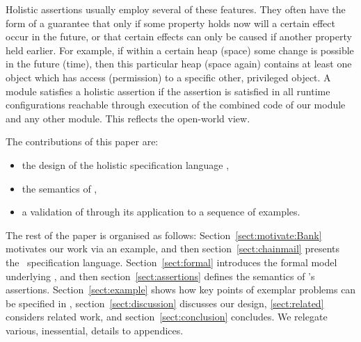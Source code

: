 Holistic assertions usually employ several of these features. They often have the form  of a guarantee
that only if some property holds now will a certain effect occur in the future, or that
certain effects can only be caused if another property held earlier.
For example, if within a certain heap (space) some change is possible in the future (time), then this particular heap 
(space again) contains 
at least one object which has access (permission) to a specific other, privileged object.
A module satisfies a holistic assertion if  
 the assertion is satisfied  in all runtime configurations reachable through execution of the combined code of our module and any other module.
  This reflects the open-world view.


The contributions of this paper are:
\begin{itemize}
\item the design of the holistic specification language \Chainmail,
\item the semantics of \Chainmail,
\item a validation of \Chainmail through its application to a sequence of examples.
\end{itemize}  
  
  
The rest of the paper is organised as follows: Section~\ref{sect:motivate:Bank} 
motivates our work via an example, and then
section~\ref{sect:chainmail} presents the \Chainmail\ specification
language.  Section~\ref{sect:formal} introduces the formal model
underlying \Chainmail, and then section~\ref{sect:assertions} defines
the 
semantics of \Chainmail's assertions.
Section~\ref{sect:example} shows how key points of 
exemplar problems can be specified in \Chainmail,
section~\ref{sect:discussion}
discusses our design, \ref{sect:related} considers related
work, and section~\ref{sect:conclusion} concludes.
We relegate various, inessential, details to appendices.
